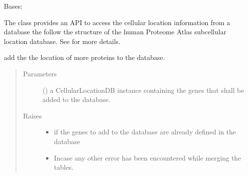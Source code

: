\documentclass[letterpaper,10pt,english]{sphinxmanual}
\begin{document}
\begin{fulllineitems}
\label{\detokenize{IPTK.Classes:IPTK.Classes.Database.CellularLocationDB}}
Bases: 

The class provides an API to access the cellular location information from a database   the follow the structure of the human Proteome Atlas sub\sphinxhyphen{}cellular location database. See     for more details.

\begin{fulllineitems}
\label{\detokenize{IPTK.Classes:IPTK.Classes.Database.CellularLocationDB.add_to_database}}
add the the location of more proteins to the database.
\begin{quote}\begin{description}
\item[{Parameters}] \leavevmode
{} ({\hyperref[\detokenize{IPTK.Classes:IPTK.Classes.Database.CellularLocationDB}]{}}) \textendash{} a CellularLocationDB instance containing the genes that shall be added to the database.

\item[{Raises}] \leavevmode\begin{itemize}
\item {} 
 \textendash{} if the genes to add to the database are already defined in the database

\item {} 
 \textendash{} Incase any other error has been encountered while merging the tables.


\end{itemize}
\end{description}
\end{quote}
\end{fulllineitems}
\end{fulllineitems}
\end{document}
